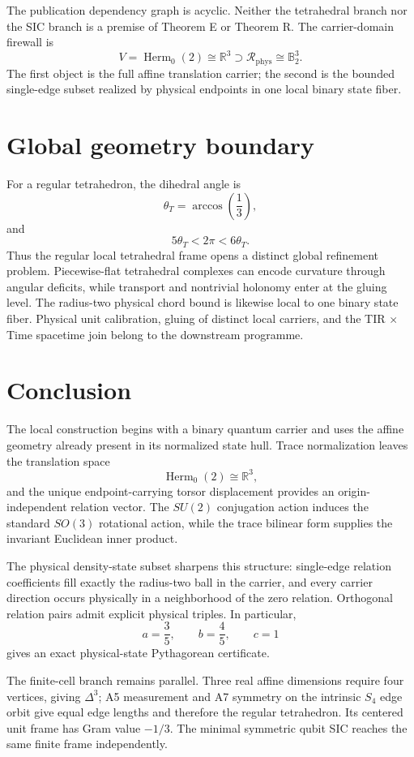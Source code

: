 \documentclass[12pt,a4paper]{article}
\newcommand{\Herm}{\operatorname{Herm}}
\newcommand{\R}{\mathbb{R}}
\newcommand{\Rphys}{\mathcal{R}_{\mathrm{phys}}}
\begin{document}
The publication dependency graph is acyclic. Neither the tetrahedral branch nor the SIC branch is a premise of Theorem E or Theorem R. The carrier-domain firewall is
\[
\boxed{
V=\Herm_0(2)\cong\R^3
\supset
\Rphys\cong\mathbb B^3_2.
}
\]
The first object is the full affine translation carrier; the second is the bounded single-edge subset realized by physical endpoints in one local binary state fiber.

\section{Global geometry boundary}

For a regular tetrahedron, the dihedral angle is
\[
\boxed{\theta_T=\arccos\left(\frac13\right),}
\]
and
\[
\boxed{5\theta_T<2\pi<6\theta_T.}
\]
Thus the regular local tetrahedral frame opens a distinct global refinement problem. Piecewise-flat tetrahedral complexes can encode curvature through angular deficits, while transport and nontrivial holonomy enter at the gluing level. The radius-two physical chord bound is likewise local to one binary state fiber. Physical unit calibration, gluing of distinct local carriers, and the TIR $\times$ Time spacetime join belong to the downstream programme.

\section{Conclusion}

The local construction begins with a binary quantum carrier and uses the affine geometry already present in its normalized state hull. Trace normalization leaves the translation space
\[
\Herm_0(2)\cong\R^3,
\]
and the unique endpoint-carrying torsor displacement provides an origin-independent relation vector. The $SU(2)$ conjugation action induces the standard $SO(3)$ rotational action, while the trace bilinear form supplies the invariant Euclidean inner product.

The physical density-state subset sharpens this structure: single-edge relation coefficients fill exactly the radius-two ball in the carrier, and every carrier direction occurs physically in a neighborhood of the zero relation. Orthogonal relation pairs admit explicit physical triples. In particular,
\[
\boxed{
a=\frac35,\qquad b=\frac45,\qquad c=1}
\]
gives an exact physical-state Pythagorean certificate.

The finite-cell branch remains parallel. Three real affine dimensions require four vertices, giving $\Delta^3$; A5 measurement and A7 symmetry on the intrinsic $S_4$ edge orbit give equal edge lengths and therefore the regular tetrahedron. Its centered unit frame has Gram value $-1/3$. The minimal symmetric qubit SIC reaches the same finite frame independently.
\end{document}
